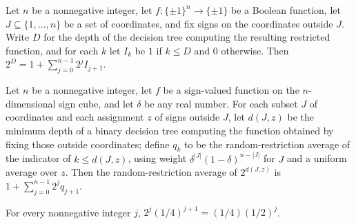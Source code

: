 \begin{theorem}
\label{FABL.two_pow_restrictedDecisionTreeDepth_eq_tailIndicators}
\leanok
{}
Let $n$ be a nonnegative integer, let $f:\{\pm1\}^n\to\{\pm1\}$ be a Boolean function,
let $J\subseteq\{1,\ldots,n\}$ be a set of coordinates, and fix signs on the coordinates
outside $J$. Write $D$ for the depth of the decision tree computing the resulting
restricted function, and for each $k$ let $I_k$ be $1$ if $k\le D$ and $0$ otherwise.
Then $2^D=1+\sum_{j=0}^{n-1}2^j I_{j+1}$.
\end{theorem}

\begin{theorem}
\label{FABL.expect_two_pow_restrictedDecisionTreeDepth_eq_failureSum}
\leanok
{}
Let $n$ be a nonnegative integer, let $f$ be a sign-valued function on the
$n$-dimensional sign cube, and let $\delta$ be any real number. For each subset $J$ of
coordinates and each assignment $z$ of signs outside $J$, let $d(J,z)$ be the minimum
depth of a binary decision tree computing the function obtained by fixing those outside
coordinates; define $q_k$ to be the random-restriction average of the indicator of $k\le
d(J,z)$, using weight $\delta^{|J|}(1-\delta)^{n-|J|}$ for $J$ and a uniform average
over $z$. Then the random-restriction average of $2^{d(J,z)}$ is $1+\sum_{j=0}^{n-1}2^j
q_{j+1}$.
\end{theorem}

\begin{theorem}
\label{FABL.two_pow_mul_quarter_pow_succ}
\leanok
{}
For every nonnegative integer $j$, $2^j(1/4)^{j+1}=(1/4)(1/2)^j$.
\end{theorem}

